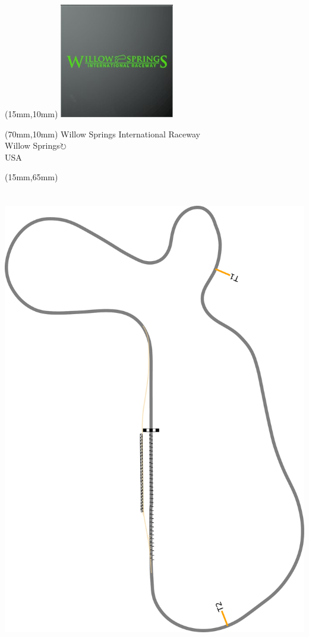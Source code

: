\null\newpage
\begin{textblock*}{50mm}(15mm,10mm)%
\includegraphics[width=50mm]{LG/2015-05-20_00098.png}
\end{textblock*}
\begin{textblock*}{130mm}(70mm,10mm)%
{\fontsize{20}{20}\selectfont Willow Springs International Raceway\\}
{\fontsize{16}{16}\selectfont Willow Springs\hfill \Large$\circlearrowright$\\}
{\fontsize{12}{12}\selectfont USA\\}
\end{textblock*}
\begin{textblock*}{185mm}(15mm,65mm)%
\centering
\mbox{\includegraphics[width=185mm,height=210mm,keepaspectratio]{PT/WSPIR.pdf}}
\end{textblock*}
